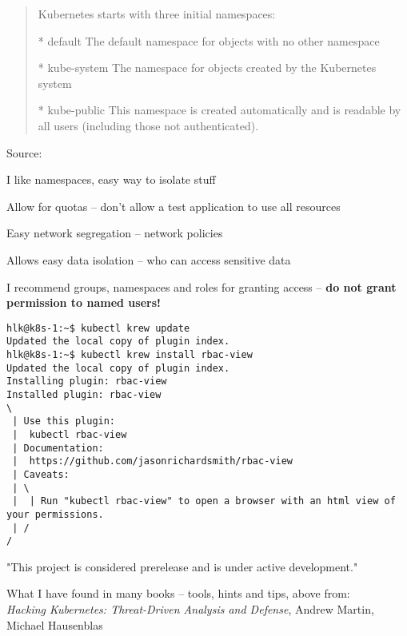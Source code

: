 \documentclass[Screen16to9,17pt]{foils}
\begin{document}

\begin{quote}
Kubernetes starts with three initial namespaces:
\begin{list2}
\item[*] default The default namespace for objects with no other namespace
\item[*] kube-system The namespace for objects created by the Kubernetes system
\item[*] kube-public This namespace is created automatically and is readable by all users (including those not authenticated).
\end{list2}
\end{quote}
Source: 

\begin{list2}
\item I like namespaces, easy way to isolate stuff
\item Allow for quotas -- don't allow a test application to use all resources
\item Easy network segregation -- network policies
\item Allows easy data isolation -- who can access sensitive data
\item I recommend groups, namespaces and roles for granting access -- {\bf do not grant permission to named users!}
\end{list2}




\begin{verbatim}
hlk@k8s-1:~$ kubectl krew update
Updated the local copy of plugin index.
hlk@k8s-1:~$ kubectl krew install rbac-view
Updated the local copy of plugin index.
Installing plugin: rbac-view
Installed plugin: rbac-view
\
 | Use this plugin:
 | 	kubectl rbac-view
 | Documentation:
 | 	https://github.com/jasonrichardsmith/rbac-view
 | Caveats:
 | \
 |  | Run "kubectl rbac-view" to open a browser with an html view of your permissions.
 | /
/
\end{verbatim}

\begin{list2}
\item "This project is considered prerelease and is under active development."
\item What I have found in many books -- tools, hints and tips, above from:\\
\emph{Hacking Kubernetes: Threat-Driven Analysis and Defense}, Andrew Martin, Michael Hausenblas
\end{list2}
\end{document}
